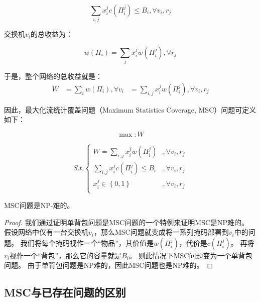 \begin{equation}
    \sum_{i,j} x_i^j c(\Pi^j_i) \le B_i, \forall v_i,r_j   
\end{equation}

交换机$v_i$的总收益为：

\begin{equation}
    w(\Pi_i) = \sum_{j} x_i^j w(\Pi^j_i), \forall r_j
\end{equation}

于是，整个网络的总收益就是：
\begin{equation}
\begin{aligned}
    W &= \sum_i w(\Pi_i), \forall v_i
      &= \sum_{i,j} x_i^j w(\Pi^j_i), \forall v_i,r_j
\end{aligned}
\end{equation}

因此，最大化流统计覆盖问题（Maximum Statistics Coverage, MSC）问题可定义如下：

\begin{equation*}
\max :  W
\end{equation*}

\begin{equation}\label{eq:msc}
{S.t.}
\begin{cases}
W = \sum_{i,j} x_i^j w(\Pi^j_i) &, \forall v_i,r_j\\
\sum_{i,j} x_i^j c(\Pi^j_i) \le B_i &, \forall v_i,r_j   \\
x^j_{i}\in \left\{ {0,1} \right\} &,   \forall v_i,r_j  \\
\end{cases}
\end{equation}

\begin{theorem}\label{thm:nphard}
    MSC问题是NP-难的。
\end{theorem}

\begin{proof}
我们通过证明单背包问题\cite{ingargiola1973reduction}是MSC问题的一个特例来证明MSC是NP难的。
假设网络中仅有一台交换机$v_i$，那么MSC问题就变成将一系列掩码部署到$v_i$中的问题。
我们将每个掩码视作一个“物品”，其价值是$w(\Pi^j_i)$，代价是$c(\Pi^j_i)$。
再将$v_i$视作一个“背包”，那么它的容量就是$B_i$。
则此情况下MSC问题变为一个单背包问题。
由于单背包问题是NP难的\cite{ingargiola1973reduction}，因此MSC问题也是NP难的。
\end{proof}


\subsection{MSC与已存在问题的区别}\label{sec:differenceproblem}

